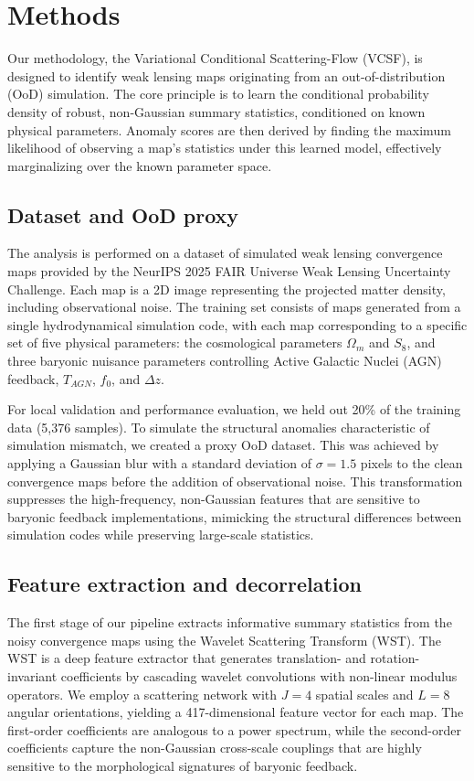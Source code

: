 \documentclass[]{article}
\begin{document}
\section{Methods}
\label{sec:methods}
Our methodology, the Variational Conditional Scattering-Flow (VCSF), is designed to identify weak lensing maps originating from an out-of-distribution (OoD) simulation. The core principle is to learn the conditional probability density of robust, non-Gaussian summary statistics, conditioned on known physical parameters. Anomaly scores are then derived by finding the maximum likelihood of observing a map's statistics under this learned model, effectively marginalizing over the known parameter space.

\subsection{Dataset and OoD proxy}
The analysis is performed on a dataset of simulated weak lensing convergence maps provided by the NeurIPS 2025 FAIR Universe Weak Lensing Uncertainty Challenge. Each map is a 2D image representing the projected matter density, including observational noise. The training set consists of maps generated from a single hydrodynamical simulation code, with each map corresponding to a specific set of five physical parameters: the cosmological parameters $\Omega_m$ and $S_8$, and three baryonic nuisance parameters controlling Active Galactic Nuclei (AGN) feedback, $T_{AGN}$, $f_0$, and $\Delta z$.

For local validation and performance evaluation, we held out 20\% of the training data (5,376 samples). To simulate the structural anomalies characteristic of simulation mismatch, we created a proxy OoD dataset. This was achieved by applying a Gaussian blur with a standard deviation of $\sigma = 1.5$ pixels to the clean convergence maps before the addition of observational noise. This transformation suppresses the high-frequency, non-Gaussian features that are sensitive to baryonic feedback implementations, mimicking the structural differences between simulation codes while preserving large-scale statistics.

\subsection{Feature extraction and decorrelation}
The first stage of our pipeline extracts informative summary statistics from the noisy convergence maps using the Wavelet Scattering Transform (WST). The WST is a deep feature extractor that generates translation- and rotation-invariant coefficients by cascading wavelet convolutions with non-linear modulus operators. We employ a scattering network with $J=4$ spatial scales and $L=8$ angular orientations, yielding a 417-dimensional feature vector for each map. The first-order coefficients are analogous to a power spectrum, while the second-order coefficients capture the non-Gaussian cross-scale couplings that are highly sensitive to the morphological signatures of baryonic feedback.
\end{document}
